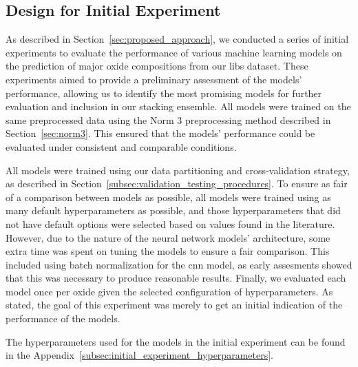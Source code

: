 \subsection{Design for Initial Experiment}\label{sec:initial-experiment}
As described in Section~\ref{sec:proposed_approach}, we conducted a series of initial experiments to evaluate the performance of various machine learning models on the prediction of major oxide compositions from our \gls{libs} dataset.
These experiments aimed to provide a preliminary assessment of the models' performance, allowing us to identify the most promising models for further evaluation and inclusion in our stacking ensemble.
All models were trained on the same preprocessed data using the Norm 3 preprocessing method described in Section~\ref{sec:norm3}.
This ensured that the models' performance could be evaluated under consistent and comparable conditions.

All models were trained using our data partitioning and cross-validation strategy, as described in Section~\ref{subsec:validation_testing_procedures}. 
To ensure as fair of a comparison between models as possible, all models were trained using as many default hyperparameters as possible, and those hyperparameters that did not have default options were selected based on values found in the literature.
However, due to the nature of the neural network models' architecture, some extra time was spent on tuning the models to ensure a fair comparison.
This included using batch normalization for the \gls{cnn} model, as early assesments showed that this was necessary to produce reasonable results.
Finally, we evaluated each model once per oxide given the selected configuration of hyperparameters. 
As stated, the goal of this experiment was merely to get an initial indication of the performance of the models.

The hyperparameters used for the models in the initial experiment can be found in the Appendix~\ref{subsec:initial_experiment_hyperparameters}.